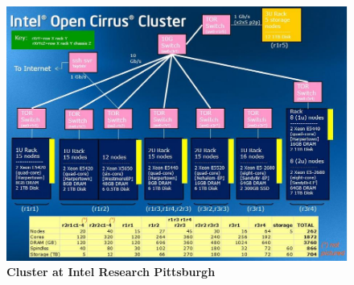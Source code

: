 \begin{figure}[h]
\centering
  \includegraphics[keepaspectratio,width=\columnwidth]{figures/bigdata.jpg}
  \caption{\textbf{Cluster at Intel Research Pittsburgh\cite{bigdatafig}}}
  \label{fig:bigdata}
\end{figure}



